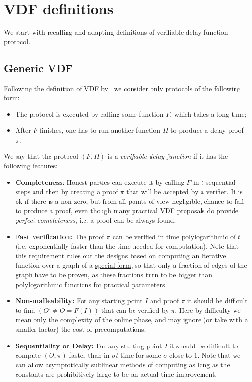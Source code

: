 \documentclass{article}
\begin{document}
\section{VDF definitions}

We start with recalling and adapting definitions of verifiable delay function protocol. 

\subsection{Generic VDF}\label{sec:genvdf}

Following the definition of VDF by~\cite{DBLP:conf/crypto/BonehBBF18} we consider only protocols of the following form:
\begin{itemize}
    \item The protocol is executed by calling some function $F$, which takes a long time;
    \item After $F$ finishes, one has to run another function $\Pi$ to produce a delay proof $\pi$.
\end{itemize}
We say that the protocol $(F,\Pi)$ is a \emph{verifiable delay function}  if it has the following features:
\begin{itemize}
    \item \textbf{Completeness:} Honest parties can execute it by calling $F$ in $t$ sequential steps and then by creating a proof $\pi$ that will be accepted by a verifier. It is ok if there is a non-zero, but from all points of view negligible, chance to fail to produce a proof, even though many practical VDF proposals do provide \emph{perfect completeness}, i.e. a proof can be always found.
    \item \textbf{Fast verification:} The proof $\pi$ can be verified in time polylogarithmic of $t$  (i.e. exponentially faster than the time needed for computation).  Note that this requirement rules out the designs based on computing an iterative function over a graph of a \href{https://cs.brown.edu/research/pubs/theses/ugrad/2019/zhang.aaron.pdf}{special form}, so that only a fraction of edges of the graph have to be proven, as these fractions turn to be bigger than polylogarithmic functions for practical parameters.
    \item \textbf{Non-malleability:} For any starting point $I$ and proof $\pi$ it should be difficult to find $(O'\neq O=F(I))$ that can be verified by $\pi$. Here by difficulty we mean only the complexity of the online phase, and may ignore (or take with a smaller factor) the cost of  precomputations.
    \item \textbf{Sequentiality or Delay:}  For any starting point $I$ it should be difficult to compute $(O,\pi)$ faster than in $\sigma t $ time for some  $\sigma $ close to 1. Note that we can allow asymptotically sublinear methods of computing as long as the constants are prohibitively large to be an actual time improvement.
\end{itemize}
\end{document}
